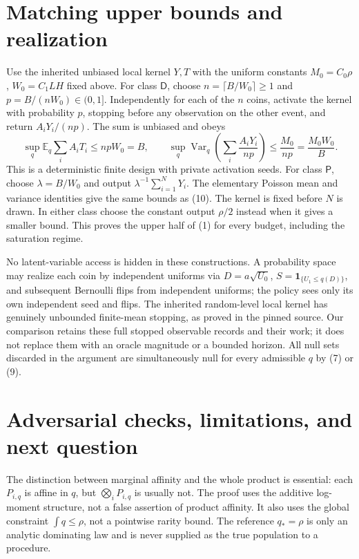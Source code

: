 \documentclass[11pt]{article}
\newcommand{\E}{\mathbb E}
\newcommand{\Var}{\operatorname{Var}}
\begin{document}
\section{Matching upper bounds and realization}
Use the inherited unbiased local kernel $Y,T$ with the uniform constants
$M_0=C_0\rho$, $W_0=C_1LH$ fixed above. For class $\mathsf D$, choose
$n=\lceil B/W_0\rceil\ge1$ and $p=B/(nW_0)\in(0,1]$.
Independently for each of the $n$ coins, activate the kernel with probability
$p$, stopping before any observation on the other event, and return
$A_iY_i/(np)$. The sum is unbiased and obeys
\[
 \sup_q\E_q\sum_i A_iT_i\le npW_0=B,\qquad
 \sup_q\Var_q\left(\sum_i\frac{A_iY_i}{np}\right)
       \le\frac{M_0}{np}=\frac{M_0W_0}{B}.                 \tag{10}
\]
This is a deterministic finite design with private activation seeds.
For class $\mathsf P$, choose $\lambda=B/W_0$ and output
$\lambda^{-1}\sum_{i=1}^N Y_i$. The elementary Poisson mean and variance
identities give the same bounds as (10). The kernel is fixed before $N$
is drawn. In either class choose the constant output $\rho/2$ instead when
it gives a smaller bound. This proves the upper half of (1) for every
budget, including the saturation regime.

No latent-variable access is hidden in these constructions. A probability
space may realize each coin by independent uniforms via
$D=a\sqrt{U_0}$, $S=\mathbf1_{\{U_1\le q(D)\}}$, and subsequent
Bernoulli flips from independent uniforms; the policy sees only its own
independent seed and flips. The inherited random-level local kernel has
genuinely unbounded finite-mean stopping, as proved in the pinned source.
Our comparison retains these full stopped observable records and their
work; it does not replace them with an oracle magnitude or a bounded
horizon. All null sets discarded in the argument are simultaneously null
for every admissible $q$ by (7) or (9).

\section{Adversarial checks, limitations, and next question}
The distinction between marginal affinity and the whole product is
essential: each $P_{i,q}$ is affine in $q$, but
$\bigotimes_iP_{i,q}$ is usually not. The proof uses the additive
log-moment structure, not a false assertion of product affinity.
It also uses the global constraint $\int q\le\rho$, not a pointwise rarity
bound. The reference $q_*=\rho$ is only an analytic dominating law and is
never supplied as the true population to a procedure.
\end{document}

